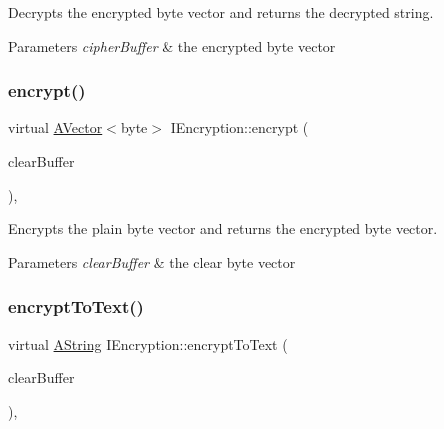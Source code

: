 Decrypts the encrypted byte vector and returns the decrypted string. 


\begin{DoxyParams}{Parameters}
{\em cipher\+Buffer} & the encrypted byte vector \\
\hline
\end{DoxyParams}
\mbox{\label{class_i_encryption_aa888b4e42172490054708fb099626458}} 
\subsubsection{\texorpdfstring{encrypt()}{encrypt()}}
{\footnotesize\ttfamily virtual \mbox{\hyperlink{class_a_vector}{A\+Vector}}$<$byte$>$ I\+Encryption\+::encrypt (\begin{DoxyParamCaption}\item[{const \mbox{\hyperlink{class_a_vector}{A\+Vector}}$<$ byte $>$ \&}]{clear\+Buffer }\end{DoxyParamCaption})\hspace{0.3cm}{\ttfamily [protected]}, {}}



Encrypts the plain byte vector and returns the encrypted byte vector. 


\begin{DoxyParams}{Parameters}
{\em clear\+Buffer} & the clear byte vector \\
\hline
\end{DoxyParams}
\mbox{\label{class_i_encryption_aef8211993831f83e031e7f1e9f978a4d}} 
\subsubsection{\texorpdfstring{encryptToText()}{encryptToText()}}
{\footnotesize\ttfamily virtual \mbox{\hyperlink{class_a_string}{A\+String}} I\+Encryption\+::encrypt\+To\+Text (\begin{DoxyParamCaption}\item[{const \mbox{\hyperlink{class_a_vector}{A\+Vector}}$<$ byte $>$ \&}]{clear\+Buffer }\end{DoxyParamCaption})\hspace{0.3cm}{\ttfamily [protected]}, {}}



